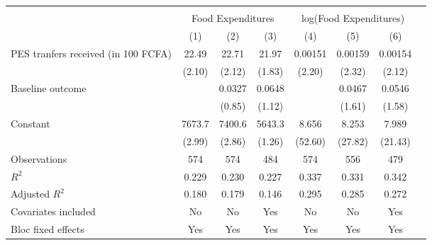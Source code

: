\begin{tabular}{l*{7}{c}} \hline\hline  \\ & \multicolumn{3}{c}{Food Expenditures} & \multicolumn{3}{c}{log(Food Expenditures)} \\  \cmidrule(lr){2-4} \cmidrule(lr){5-7} 
                    &\multicolumn{1}{c}{(1)}         &\multicolumn{1}{c}{(2)}         &\multicolumn{1}{c}{(3)}         &\multicolumn{1}{c}{(4)}         &\multicolumn{1}{c}{(5)}         &\multicolumn{1}{c}{(6)}         \\
\hline
PES tranfers received (in 100 FCFA)&       22.49\sym{**} &       22.71\sym{**} &       21.97\sym{*}  &     0.00151\sym{**} &     0.00159\sym{**} &     0.00154\sym{**} \\
                    &      (2.10)         &      (2.12)         &      (1.83)         &      (2.20)         &      (2.32)         &      (2.12)         \\
[1em]
Baseline outcome    &                     &      0.0327         &      0.0648         &                     &      0.0467         &      0.0546         \\
                    &                     &      (0.85)         &      (1.12)         &                     &      (1.61)         &      (1.58)         \\
[1em]
Constant            &      7673.7\sym{***}&      7400.6\sym{***}&      5643.3         &       8.656\sym{***}&       8.253\sym{***}&       7.989\sym{***}\\
                    &      (2.99)         &      (2.86)         &      (1.26)         &     (52.60)         &     (27.82)         &     (21.43)         \\
\hline
Observations        &         574         &         574         &         484         &         574         &         556         &         479         \\
\(R^{2}\)           &       0.229         &       0.230         &       0.227         &       0.337         &       0.331         &       0.342         \\
Adjusted \(R^{2}\)  &       0.180         &       0.179         &       0.146         &       0.295         &       0.285         &       0.272         \\
Covariates included &          No         &          No         &         Yes         &          No         &          No         &         Yes         \\
Bloc fixed effects  &         Yes         &         Yes         &         Yes         &         Yes         &         Yes         &         Yes         \\

\end{tabular}

